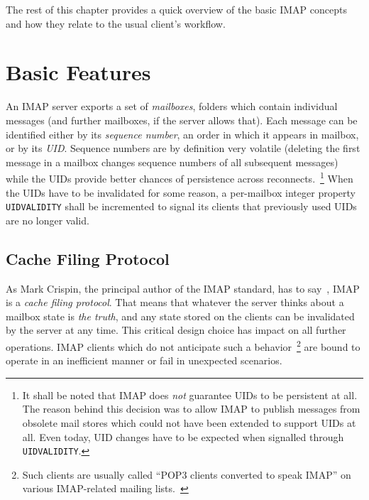 \documentclass[trojita]{subfiles}
\begin{document}
The rest of this chapter provides a quick overview of the basic IMAP concepts and how they relate to the usual client's
workflow.

\section{Basic Features}

An IMAP server exports a set of {\em mailboxes}, folders which contain individual messages (and further mailboxes, if
the server allows that).  Each message can be identified either by its {\em sequence number}, an order in which it
appears in mailbox, or by its {\em UID}.  Sequence numbers are by definition very volatile (deleting the first message
in a mailbox changes sequence numbers of all subsequent messages) while the UIDs provide better chances of persistence
across reconnects.~\footnote{It shall be noted that IMAP does {\em not} guarantee UIDs to be persistent at all.  The
reason behind this decision was to allow IMAP to publish messages from obsolete mail stores which could not have been
extended to support UIDs at all.  Even today, UID changes have to be expected when signalled through {\tt UIDVALIDITY}.}
When the UIDs have to be invalidated for some reason, a per-mailbox integer property {\tt UIDVALIDITY} shall be
incremented to signal its clients that previously used UIDs are no longer valid.

\subsection{Cache Filing Protocol}

As Mark Crispin, the principal author of the IMAP standard, has to say~\cite{crispin-imap-cache-filing}, IMAP is a {\em
cache filing protocol}.  That means that whatever the server thinks about a mailbox state is {\em the truth}, and any
state stored on the clients can be invalidated by the server at any time.  This critical design choice has impact on all
further operations.  IMAP clients which do not anticipate such a behavior~\footnote{Such clients are usually called
``POP3 clients converted to speak IMAP'' on various IMAP-related mailing
lists.~\cite{shannon-imap-clients-glorified-imap}} are bound to operate in an inefficient manner or fail in unexpected
scenarios.
\end{document}
